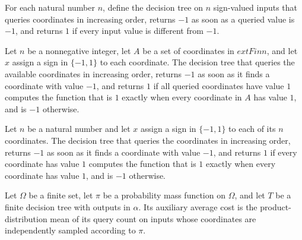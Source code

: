 \begin{definition}
\label{FABL.sequentialOrTree}
\leanok
{}
For each natural number $n$, define the decision tree on $n$ sign-valued inputs that
queries coordinates in increasing order, returns $-1$ as soon as a queried value is
$-1$, and returns $1$ if every input value is different from $-1$.
\end{definition}

\begin{theorem}
\label{FABL.sequentialOrTreeAux_computes}
\leanok
{}
Let $n$ be a nonnegative integer, let $A$ be a set of coordinates in $	ext{Fin }n$, and
let $x$ assign a sign in $\{ -1,1 \}$ to each coordinate. The decision tree that
queries the available coordinates in increasing order, returns $-1$ as soon as it finds
a coordinate with value $-1$, and returns $1$ if all queried coordinates have value $1$
computes the function that is $1$ exactly when every coordinate in $A$ has value $1$,
and is $-1$ otherwise.
\end{theorem}

\begin{theorem}
\label{FABL.sequentialOrTree_computes}
\leanok
{}
Let $n$ be a natural number and let $x$ assign a sign in $\{ -1,1 \}$ to each of its $n$
coordinates. The decision tree that queries the coordinates in increasing order, returns
$-1$ as soon as it finds a coordinate with value $-1$, and returns $1$ if every
coordinate has value $1$ computes the function that is $1$ exactly when every coordinate
has value $1$, and is $-1$ otherwise.
\end{theorem}

\begin{definition}
\label{FABL.FiniteDecisionTree.auxiliaryAverageCost}
\leanok
{}
Let $\Omega$ be a finite set, let $\pi$ be a probability mass function on $\Omega$, and
let $T$ be a finite decision tree with outputs in $\alpha$. Its auxiliary average cost
is the product-distribution mean of its query count on inputs whose coordinates are
independently sampled according to $\pi$.
\end{definition}

